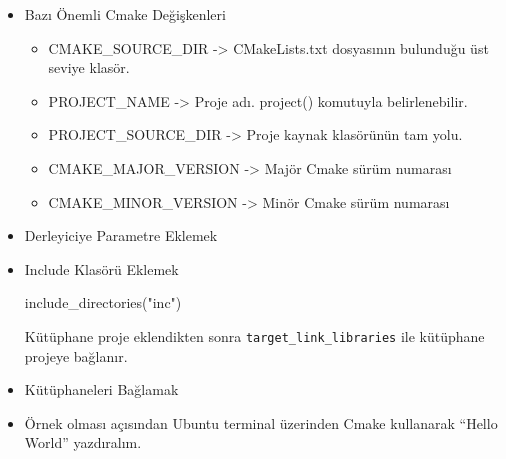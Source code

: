 \documentclass[
]{book}
\newenvironment{Shaded}{\begin{snugshade}}{\end{snugshade}}
\newcommand{\ExtensionTok}[1]{#1}
\newcommand{\KeywordTok}[1]{\textcolor[rgb]{0.13,0.29,0.53}{\textbf{#1}}}
\newcommand{\NormalTok}[1]{#1}
\newcommand{\OperatorTok}[1]{\textcolor[rgb]{0.81,0.36,0.00}{\textbf{#1}}}
\newcommand{\StringTok}[1]{\textcolor[rgb]{0.31,0.60,0.02}{#1}}
\newcommand{\VariableTok}[1]{\textcolor[rgb]{0.00,0.00,0.00}{#1}}
\providecommand{\tightlist}{%
  \setlength{\itemsep}{0pt}\setlength{\parskip}{0pt}}
\begin{document}
\begin{itemize}
\item
  Bazı Önemli Cmake Değişkenleri

  \begin{itemize}
  \tightlist
  \item
    CMAKE\_SOURCE\_DIR -\textgreater{} CMakeLists.txt dosyasının bulunduğu üst seviye klasör.
  \item
    PROJECT\_NAME -\textgreater{} Proje adı. project() komutuyla belirlenebilir.
  \item
    PROJECT\_SOURCE\_DIR -\textgreater{} Proje kaynak klasörünün tam yolu.
  \item
    CMAKE\_MAJOR\_VERSION -\textgreater{} Majör Cmake sürüm numarası
  \item
    CMAKE\_MINOR\_VERSION -\textgreater{} Minör Cmake sürüm numarası
  \end{itemize}
\item
  Derleyiciye Parametre Eklemek

\begin{Shaded}
\end{Shaded}
\item
  Include Klasörü Eklemek

\begin{Shaded}
\begin{Highlighting}[]
 \ExtensionTok{include\_directories}\NormalTok{(}\StringTok{"inc"}\NormalTok{)}
\end{Highlighting}
\end{Shaded}

  Kütüphane proje eklendikten sonra \texttt{target\_link\_libraries} ile kütüphane projeye bağlanır.
\item
  Kütüphaneleri Bağlamak

\begin{Shaded}
\end{Shaded}
\item
  Örnek olması açısından Ubuntu terminal üzerinden Cmake kullanarak ``Hello World'' yazdıralım.
\end{itemize}
\end{document}
